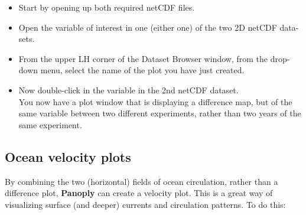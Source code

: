 \documentclass[11pt,fleqn]{book} %
\begin{document}
\begin{itemize}
\vspace{1mm}
\item Start by opening up both required netCDF files.
\vspace{1mm}
\item Open the variable of interest in one (either one) of the two 2D netCDF data-sets. 
\vspace{1mm}
\item From the upper LH corner of the Dataset Browser window, from the drop-down menu, select the name of the plot you have just created.
\vspace{1mm}
\item Now double-click in the variable in the 2nd netCDF dataset.
\\ You now have a plot window that is displaying a difference map, but of the same variable between two different experiments, rather than two years of the same experiment.
\end{itemize}
\vspace{2mm}


\subsection{Ocean velocity plots}

By combining the two (horizontal) fields of ocean circulation, rather than a difference plot, \textbf{Panoply} can create a velocity plot. This is a great way of visualizing surface (and deeper) currents and circulation patterns. To do this:
\end{document}
